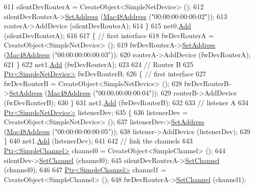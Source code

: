 \begin{DoxyCode}
611     silentDevRouterA = CreateObject<SimpleNetDevice> ();
612     silentDevRouterA->\hyperlink{classns3_1_1SimpleNetDevice_a968ef3e7318bac29d5f1d7d977029af4}{SetAddress} (\hyperlink{classns3_1_1Mac48Address}{Mac48Address} (\textcolor{stringliteral}{"00:00:00:00:00:02"}));
613     routerA->AddDevice (silentDevRouterA);
614   \}
615   net0.\hyperlink{classns3_1_1NetDeviceContainer_a7ca8bc1d7ec00fd4fcc63869987fbda5}{Add} (silentDevRouterA);
616 
617   \{ \textcolor{comment}{// first interface}
618     fwDevRouterA = CreateObject<SimpleNetDevice> ();
619     fwDevRouterA->\hyperlink{classns3_1_1SimpleNetDevice_a968ef3e7318bac29d5f1d7d977029af4}{SetAddress} (\hyperlink{classns3_1_1Mac48Address}{Mac48Address} (\textcolor{stringliteral}{"00:00:00:00:00:03"}));
620     routerA->AddDevice (fwDevRouterA);
621   \}
622   net1.\hyperlink{classns3_1_1NetDeviceContainer_a7ca8bc1d7ec00fd4fcc63869987fbda5}{Add} (fwDevRouterA);
623 
624   \textcolor{comment}{// Router B}
625   \hyperlink{classns3_1_1Ptr}{Ptr<SimpleNetDevice>} fwDevRouterB;
626   \{ \textcolor{comment}{// first interface}
627     fwDevRouterB = CreateObject<SimpleNetDevice> ();
628     fwDevRouterB->\hyperlink{classns3_1_1SimpleNetDevice_a968ef3e7318bac29d5f1d7d977029af4}{SetAddress} (\hyperlink{classns3_1_1Mac48Address}{Mac48Address} (\textcolor{stringliteral}{"00:00:00:00:00:04"}));
629     routerB->AddDevice (fwDevRouterB);
630   \}
631   net1.\hyperlink{classns3_1_1NetDeviceContainer_a7ca8bc1d7ec00fd4fcc63869987fbda5}{Add} (fwDevRouterB);
632 
633   \textcolor{comment}{// listener A}
634   \hyperlink{classns3_1_1Ptr}{Ptr<SimpleNetDevice>} listenerDev;
635   \{
636     listenerDev = CreateObject<SimpleNetDevice> ();
637     listenerDev->\hyperlink{classns3_1_1SimpleNetDevice_a968ef3e7318bac29d5f1d7d977029af4}{SetAddress} (\hyperlink{classns3_1_1Mac48Address}{Mac48Address} (\textcolor{stringliteral}{"00:00:00:00:00:05"}));
638     listener->AddDevice (listenerDev);
639   \}
640   net1.\hyperlink{classns3_1_1NetDeviceContainer_a7ca8bc1d7ec00fd4fcc63869987fbda5}{Add} (listenerDev);
641 
642   \textcolor{comment}{// link the channels}
643   \hyperlink{classns3_1_1Ptr}{Ptr<SimpleChannel>} channel0 = CreateObject<SimpleChannel> ();
644   silentDev->\hyperlink{classns3_1_1SimpleNetDevice_af9e9828ad584b5ba538f18f645f162e0}{SetChannel} (channel0);
645   silentDevRouterA->\hyperlink{classns3_1_1SimpleNetDevice_af9e9828ad584b5ba538f18f645f162e0}{SetChannel} (channel0);
646 
647   \hyperlink{classns3_1_1Ptr}{Ptr<SimpleChannel>} channel1 = CreateObject<SimpleChannel> ();
648   fwDevRouterA->\hyperlink{classns3_1_1SimpleNetDevice_af9e9828ad584b5ba538f18f645f162e0}{SetChannel} (channel1);

\end{DoxyCode}
